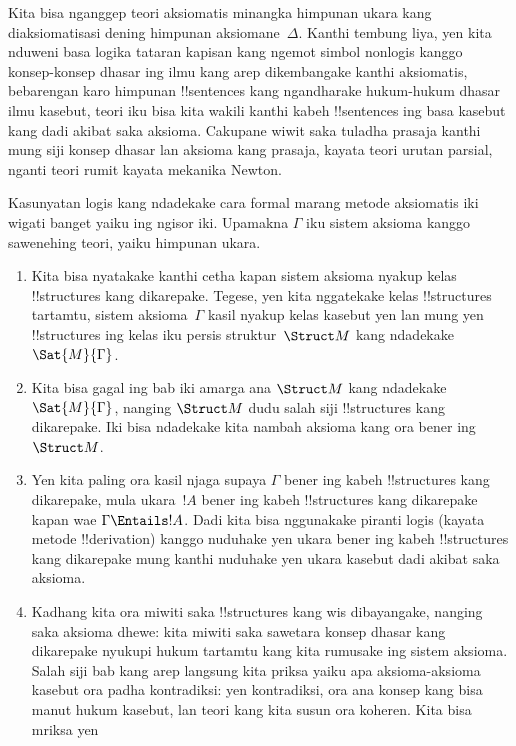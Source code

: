 \documentclass[../../../include/open-logic-section]{subfiles}
\begin{document}
\begin{explain}
Kita bisa nganggep teori aksiomatis minangka himpunan
ukara kang diaksiomatisasi dening himpunan aksiomane~$\Delta$.
Kanthi tembung liya, yen kita nduweni basa logika tataran kapisan
kang ngemot simbol nonlogis kanggo konsep-konsep dhasar
ing ilmu kang arep dikembangake kanthi aksiomatis,
bebarengan karo himpunan !!{sentence}s kang ngandharake
hukum-hukum dhasar ilmu kasebut, teori iku bisa kita
wakili kanthi kabeh !!{sentence}s ing basa kasebut
kang dadi akibat saka aksioma. Cakupane wiwit saka
tuladha prasaja kanthi mung siji konsep dhasar lan
aksioma kang prasaja, kayata teori urutan parsial,
nganti teori rumit kayata mekanika Newton.

Kasunyatan logis kang ndadekake cara formal marang
metode aksiomatis iki wigati banget yaiku ing ngisor iki.
Upamakna $\Gamma$ iku sistem aksioma kanggo sawenehing
teori, yaiku himpunan ukara.
\begin{enumerate}
\item Kita bisa nyatakake kanthi cetha kapan sistem
  aksioma nyakup kelas !!{structure}s kang dikarepake.
  Tegese, yen kita nggatekake kelas !!{structure}s tartamtu,
  sistem aksioma~$\Gamma$ kasil nyakup kelas kasebut
  yen lan mung yen !!{structure}s ing kelas iku persis
  struktur~$\Struct M$ kang ndadekake
  $\Sat{M}{\Gamma}$.
\item Kita bisa gagal ing bab iki amarga ana $\Struct M$
  kang ndadekake $\Sat{M}{\Gamma}$, nanging
  $\Struct M$ dudu salah siji !!{structure}s kang
  dikarepake. Iki bisa ndadekake kita nambah aksioma
  kang ora bener ing~$\Struct M$.
\item Yen kita paling ora kasil njaga supaya $\Gamma$
  bener ing kabeh !!{structure}s kang dikarepake,
  mula ukara~$!A$ bener ing kabeh !!{structure}s
  kang dikarepake kapan wae $\Gamma \Entails !A$.
  Dadi kita bisa nggunakake piranti logis
  (kayata metode !!{derivation}) kanggo nuduhake
  yen ukara bener ing kabeh !!{structure}s
  kang dikarepake mung kanthi nuduhake yen ukara
  kasebut dadi akibat saka aksioma.
\item Kadhang kita ora miwiti saka !!{structure}s
  kang wis dibayangake, nanging saka aksioma dhewe:
  kita miwiti saka sawetara konsep dhasar kang
  dikarepake nyukupi hukum tartamtu kang kita
  rumusake ing sistem aksioma. Salah siji bab
  kang arep langsung kita priksa yaiku apa
  aksioma-aksioma kasebut ora padha kontradiksi:
  yen kontradiksi, ora ana konsep kang bisa
  manut hukum kasebut, lan teori kang kita
  susun ora koheren. Kita bisa mriksa yen

\end{enumerate}
\end{explain}
\end{document}
